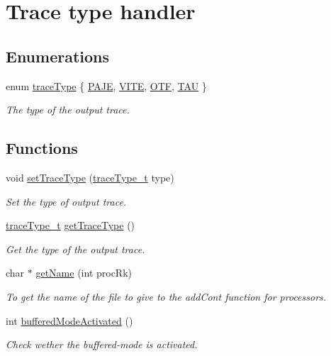 \hypertarget{group__traceType}{\section{Trace type handler}
\label{group__traceType}
}
\subsection*{Enumerations}
\begin{DoxyCompactItemize}
\item 
enum \hyperlink{group__traceType_gabfcf61a4d79aa427ef510070fce86311}{trace\-Type} \{ \hyperlink{group__traceType_gabfcf61a4d79aa427ef510070fce86311a464fcf408aa7f29de9e7828dfbc39147}{P\-A\-J\-E}, 
\hyperlink{group__traceType_gabfcf61a4d79aa427ef510070fce86311aac864727fa7382dc8f3414f1667a78b5}{V\-I\-T\-E}, 
\hyperlink{group__traceType_gabfcf61a4d79aa427ef510070fce86311a836fd85172c09b9aebf8e9712b9aae73}{O\-T\-F}, 
\hyperlink{group__traceType_gabfcf61a4d79aa427ef510070fce86311a4b124dad7992814397ae48d321af66b5}{T\-A\-U}
 \}
\begin{DoxyCompactList}\small\item\em The type of the output trace. \end{DoxyCompactList}\end{DoxyCompactItemize}
\subsection*{Functions}
\begin{DoxyCompactItemize}
\item 
void \hyperlink{group__traceType_gaa32bf7549cb819ce354ac583de6e6bbf}{set\-Trace\-Type} (\hyperlink{GTGBasic_8h_a3380a5e49e7f7e2ff3ea18f893527811}{trace\-Type\-\_\-t} type)
\begin{DoxyCompactList}\small\item\em Set the type of output trace. \end{DoxyCompactList}\item 
\hyperlink{GTGBasic_8h_a3380a5e49e7f7e2ff3ea18f893527811}{trace\-Type\-\_\-t} \hyperlink{group__traceType_gaf4e365b772f0244b5f40f7a8c21dbeda}{get\-Trace\-Type} ()
\begin{DoxyCompactList}\small\item\em Get the type of the output trace. \end{DoxyCompactList}\item 
char $\ast$ \hyperlink{group__traceType_gaffe242018ef0fb40a515c24a957f6ba9}{get\-Name} (int proc\-Rk)
\begin{DoxyCompactList}\small\item\em To get the name of the file to give to the add\-Cont function for processors. \end{DoxyCompactList}\item 
int \hyperlink{group__traceType_ga577af8ffa49fee14264099998e3d88e8}{buffered\-Mode\-Activated} ()
\begin{DoxyCompactList}\small\item\em Check wether the buffered-\/mode is activated. \end{DoxyCompactList}\end{DoxyCompactItemize}


